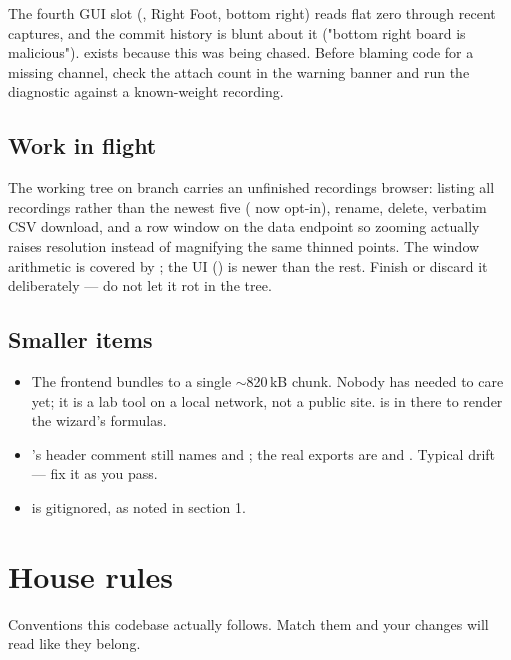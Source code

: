 \documentclass[11pt,a4paper]{article}
\begin{document}
The fourth GUI slot (, Right Foot, bottom right) reads flat zero
through recent captures, and the commit history is blunt about it ("bottom right
board is malicious").  exists because this was being
chased. Before blaming code for a missing channel, check the attach count in the
warning banner and run the diagnostic against a known-weight recording.

\subsection{Work in flight}

The working tree on branch  carries an unfinished
recordings browser: listing all recordings rather than the newest five
( now opt-in), rename, delete, verbatim CSV download, and a
\code{[from, to)} row window on the data endpoint so zooming actually raises
resolution instead of magnifying the same thinned points. The window arithmetic
is covered by ; the UI
() is newer than the rest. Finish or discard it
deliberately --- do not let it rot in the tree.

\subsection{Smaller items}

\begin{itemize}
  \item The frontend bundles to a single $\sim$820\,kB chunk. Nobody has needed
        to care yet; it is a lab tool on a local network, not a public site.
         is in there to render the wizard's formulas.
  \item {}'s header comment still names
         and ; the real exports are
         and . Typical drift --- fix
        it as you pass.
  \item {} is gitignored, as noted in section 1.
\end{itemize}

\section{House rules}

Conventions this codebase actually follows. Match them and your changes will
read like they belong.
\end{document}
